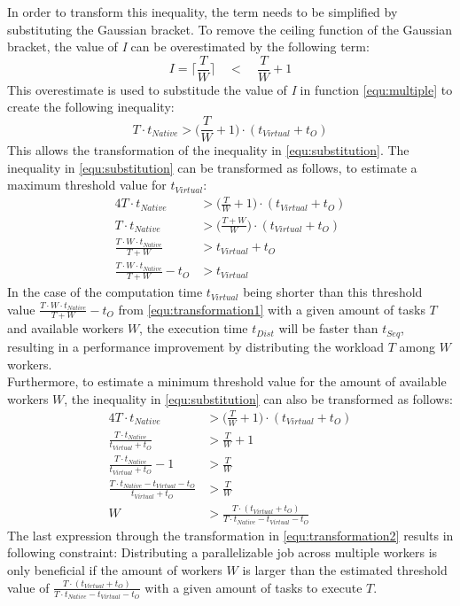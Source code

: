 In order to transform this inequality, the term needs to be simplified by substituting the Gaussian bracket. To remove the ceiling function of the Gaussian bracket, the value of \emph{I} can be overestimated by the following term:
\begin{equation}
  I = \bigg\lceil\frac{T}{W}\bigg\rceil \quad < \quad \frac{T}{W} + 1
  \label{equ:frac2}
\end{equation}
This overestimate is used to substitude the value of \emph{I} in function \eqref{equ:multiple} to create the following inequality:
\begin{equation}
  T \cdot t_{Native} > \bigg(\frac{T}{W} + 1\bigg) \cdot (t_{Virtual} + t_{O})
  \label{equ:substitution}
\end{equation}
This allows the transformation of the inequality in \eqref{equ:substitution}. The inequality in \eqref{equ:substitution} can be transformed as follows, to estimate a maximum threshold value for $t_{Virtual}$:
\begin{alignat}{4}
  T \cdot t_{Native} &> \bigg(\frac{T}{W} + 1\bigg) \cdot (t_{Virtual} + t_{O}) \nonumber \\
  T \cdot t_{Native} &> \bigg(\frac{T + W}{W}\bigg) \cdot (t_{Virtual} + t_{O}) \nonumber \\
  \frac{T \cdot W \cdot t_{Native}}{T + W} &> t_{Virtual} + t_{O} \nonumber \\
  \frac{T \cdot W \cdot t_{Native}}{T + W} - t_{O} &> t_{Virtual}
  \label{equ:transformation1}
\end{alignat}
In the case of the computation time $t_{Virtual}$ being shorter than this threshold value $\frac{T \cdot W \cdot t_{Native}}{T + W} - t_{O}$ from \eqref{equ:transformation1} with a given amount of tasks $T$ and available workers $W$, the execution time $t_{Dist}$ will be faster than $t_{Seq}$, resulting in a performance improvement by distributing the workload $T$ among $W$ workers.
~\\
Furthermore, to estimate a minimum threshold value for the amount of available workers $W$, the inequality in \eqref{equ:substitution} can also be transformed as follows:
\begin{alignat}{4}
  T \cdot t_{Native} &> \bigg(\frac{T}{W} + 1\bigg) \cdot (t_{Virtual} + t_{O}) \nonumber \\
  \frac{T \cdot t_{Native}}{t_{Virtual} + t_{O}} &> \frac{T}{W} + 1 \nonumber \\
  \frac{T \cdot t_{Native}}{t_{Virtual} + t_{O}} - 1 &> \frac{T}{W} \nonumber \\
  \frac{T \cdot t_{Native} - t_{Virtual} - t_{O}}{t_{Virtual} + t_{O}} &> \frac{T}{W} \nonumber \\
  W &> \frac{T \cdot (t_{Virtual} + t_{O})}{T \cdot t_{Native} - t_{Virtual} - t_{O}}
  \label{equ:transformation2}
\end{alignat}
The last expression through the transformation in \eqref{equ:transformation2} results in following constraint: Distributing a parallelizable job across multiple workers is only beneficial if the amount of workers $W$ is larger than the estimated threshold value of $\frac{T \cdot (t_{Virtual} + t_{O})}{T \cdot t_{Native} - t_{Virtual} - t_{O}}$ with a given amount of tasks to execute $T$.

